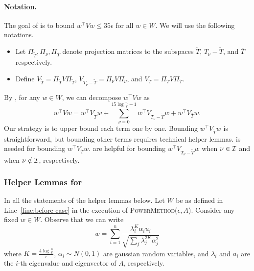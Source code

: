 \documentclass[11pt]{article}
\newcommand\uu{\boldsymbol{\mathit{u}}}
\newcommand\ww{\boldsymbol{\mathit{w}}}
\renewcommand\AA{\boldsymbol{\mathit{A}}}
\newcommand\WW{\boldsymbol{\mathit{W}}}
\newcommand\VV{\boldsymbol{\mathit{V}}}
\begin{document}
\paragraph{Notation.}The goal of  is to bound $\ww^{\top}\VV\ww\leq 35 \epsilon$ for all $\ww\in \WW$. We will use the following notations.
\begin{itemize}
    \item Let $\Pi_{\tilde{T}},\Pi_{\nu},\Pi_{\overline{T}}$ denote projection matrices to the subspaces $\tilde{T}$, $T_{\nu}-\tilde{T}$, and $\overline{T}$ respectively.
    \item  Define $\VV_{\tilde{T}} = \Pi_{\tilde{T}}\VV\Pi_{\tilde{T}}$, $\VV_{T_{\nu}-\tilde{T}} = \Pi_{\nu}\VV\Pi_{\nu}$, and $\VV_{\overline{T}} = \Pi_{\overline{T}}\VV\Pi_{\overline{T}}$.
\end{itemize}
By , for any $\ww\in \WW$, we can decompose $\ww^{\top}\VV\ww$  as 
\[
\ww^{\top}\VV\ww = \ww^{\top}\VV_{\tilde{T}}\ww+\sum_{\nu = 0}^{15\log\frac{n}{\epsilon}-1}\ww^{\top}\VV_{T_{\nu} -\tilde{T}}\ww+ \ww^{\top}\VV_{\overline{T}}\ww.
\]
Our strategy is to upper bound each term one by one. Bounding $\ww^{\top}\VV_{\tilde{T}}\ww$ is straightforward, but bounding other terms requires technical helper lemmas.
 is needed for bounding $\ww^{\top}\VV_{\overline{T}}\ww$.
 are helpful for bounding $\ww^{\top}\VV_{T_{\nu} -\tilde{T}}\ww$ when $\nu \in \cal{I}$ and when $\nu \notin \cal{I}$, respectively.


\subsubsection*{Helper Lemmas for }
In all the statements of the helper lemmas below. Let $\WW$ be as defined in Line~\ref{line:before case} in the execution of \textsc{PowerMethod}($\epsilon,\AA$). Consider any fixed $\ww\in\WW$. Observe that we can write 
\begin{equation}\label{eq:rewrite w}  
\ww=\sum_{i=1}^{n}\frac{\lambda_{i}^{K}\alpha_{i}\uu_{i}}{\sqrt{\sum_{j}\lambda_{j}^{2K}\alpha_{j}^{2}}}
\end{equation}
where $K=\frac{4\log\frac{n}{\epsilon}}{\epsilon}$, $\alpha_{i}\sim N(0,1)$ are gaussian random variables, and $\lambda_i$ and $\uu_{i}$ are the $i$-th eigenvalue and eigenvector of $\AA$, respectively.
\end{document}
